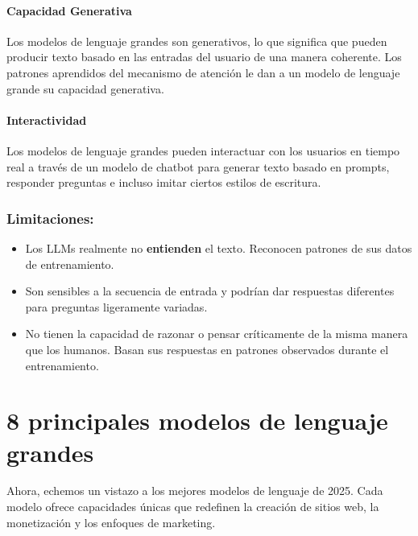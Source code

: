 \documentclass[a4paper12pt]{article}
\begin{document}
\hypertarget{capacidad-generativa}{%
\paragraph{Capacidad Generativa}\label{capacidad-generativa}}

Los modelos de lenguaje grandes son generativos, lo que significa que
pueden producir texto basado en las entradas del usuario de una manera
coherente. Los patrones aprendidos del mecanismo de atención le dan a un
modelo de lenguaje grande su capacidad generativa.

\hypertarget{interactividad}{%
\paragraph{Interactividad}\label{interactividad}}

Los modelos de lenguaje grandes pueden interactuar con los usuarios en
tiempo real a través de un modelo de chatbot para generar texto basado
en prompts, responder preguntas e incluso imitar ciertos estilos de
escritura.

\hypertarget{limitaciones}{%
\subsubsection{Limitaciones:}\label{limitaciones}}

\begin{itemize}
\item
  Los LLMs realmente no \textbf{entienden} el texto. Reconocen patrones
  de sus datos de entrenamiento.
\item
  Son sensibles a la secuencia de entrada y podrían dar respuestas
  diferentes para preguntas ligeramente variadas.
\item
  No tienen la capacidad de razonar o pensar críticamente de la misma
  manera que los humanos. Basan sus respuestas en patrones observados
  durante el entrenamiento.
\end{itemize}

    \hypertarget{principales-modelos-de-lenguaje-grandes}{%
\section{8 principales modelos de lenguaje
grandes}\label{principales-modelos-de-lenguaje-grandes}}

Ahora, echemos un vistazo a los mejores modelos de lenguaje de 2025.
Cada modelo ofrece capacidades únicas que redefinen la creación de
sitios web, la monetización y los enfoques de marketing.
\end{document}

